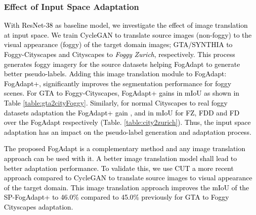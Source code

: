 \documentclass[final,5p,times,twocolumn]{elsarticle}
\begin{document}
\subsubsection{Effect of Input Space Adaptation}
\textcolor{black}{
With ResNet-38 \cite{wu2019Resnet38} as baseline model, we investigate the effect of image translation at input space.
We train CycleGAN \cite{hoffman2017cycada} to translate source images (non-foggy) to the visual appearance (foggy) of the target domain images; GTA/SYNTHIA to Foggy-Cityscapes and Cityscapes to \textit{Foggy Zurich}, respectively. This process generates foggy imagery for the source datasets helping FogAdapt to generate better pseudo-labels. 
Adding this image translation module to FogAdapt: FogAdapt+, significantly improves the segmentation performance for foggy scenes. For GTA to Foggy-Cityscapes, FogAdapt+ gains  in mIoU as shown in Table \ref{table:gta2cityFoggy}. 
Similarly, for normal Cityscapes to real foggy datasets adaptation the FogAdapt+ gain ,  and  in mIoU for FZ, FDD and FD over the FogAdapt respectively (Table. \ref{table:city2zurich}). 
Thus, the input space adaptation has an impact on the pseudo-label generation and adaptation process.}

\textcolor{black}{ The proposed FogAdapt is a complementary method and any image translation approach can be used with it. A better image translation model shall lead to better adaptation performance. To validate this, we use CUT \cite{park2020cut} a more recent approach compared to CycleGAN \cite{hoffman2017cycada} to translate source images to visual appearance of the target domain. This image translation approach improves the mIoU of the SP-FogAdapt+ to 46.0\% compared to 45.0\% previously for GTA to Foggy Cityscapes adaptation.
}
\end{document}
